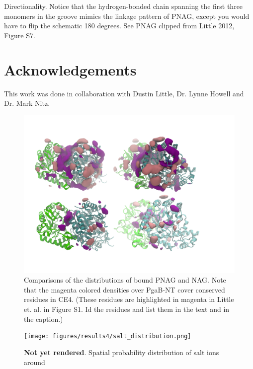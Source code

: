 Directionality. Notice that the hydrogen-bonded chain spanning the first three monomers in the groove mimics the linkage pattern of PNAG, except you would have to flip the schematic 180 degrees. See PNAG clipped from Little 2012, Figure S7.


\section{Acknowledgements}
This work was done in collaboration with Dustin Little, Dr. Lynne Howell and Dr. Mark Nitz.

\begin{figure}[htbp]
\centering
\includegraphics[width=7in]{figures/results4/pnag_nag_sdf_zoomedout.png}
\caption{Comparisons of the distributions of bound PNAG and NAG. Note that the magenta colored densities over PgaB-NT cover conserved residues in CE4.  (These residues are highlighted in magenta in Little et. al. in Figure S1. Id the residues and list them in the text and in the caption.)}
\label{fig:pnag_nag_overlapped_zoomedout}
\end{figure}

\begin{figure}[htbp]
\centering
\texttt{[image: figures/results4/salt\_distribution.png]}
\caption[Ionic distribution]{\textbf{Not yet rendered}. Spatial probability distribution of salt ions around \pgab}
\label{fig:salt_density_distribution}
\end{figure}

